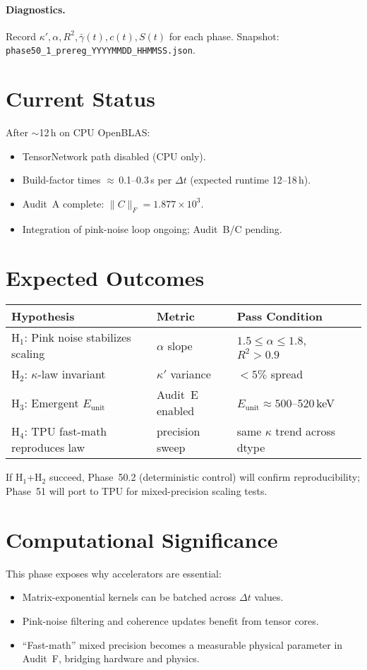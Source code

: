\documentclass[11pt]{article}
\begin{document}
\paragraph{Diagnostics.}  
Record \(\kappa', \alpha, R^2, \bar{\gamma}(t), c(t), S(t)\) for each phase.  
Snapshot: \texttt{phase50\_1\_prereg\_YYYYMMDD\_HHMMSS.json}.

\section{Current Status}
After $\sim$12\,h on CPU OpenBLAS:
\begin{itemize}
\item TensorNetwork path disabled (CPU only).
\item Build-factor times $\approx$\,0.1–0.3\,s per $\Delta t$ (expected runtime 12–18\,h).
\item Audit~A complete: $\|C\|_F = 1.877\times10^3$.
\item Integration of pink-noise loop ongoing; Audit~B/C pending.
\end{itemize}

\section{Expected Outcomes}
\begin{center}
\begin{tabular}{@{}llll@{}}
\toprule
Hypothesis & Metric & Pass Condition \\ \midrule
H$_1$: Pink noise stabilizes scaling & $\alpha$ slope & $1.5\le\alpha\le1.8$, $R^2>0.9$ \\
H$_2$: \(\kappa\)-law invariant & $\kappa'$ variance & $<5\%$ spread \\
H$_3$: Emergent \(E_{\text{unit}}\) & Audit~E enabled & $E_{\text{unit}}\!\approx\!500$–520\,keV \\
H$_4$: TPU fast-math reproduces law & precision sweep & same $\kappa$ trend across dtype \\ \bottomrule
\end{tabular}
\end{center}

If H$_1$+H$_2$ succeed, Phase~50.2 (deterministic control) will confirm reproducibility; Phase~51 will port to TPU for mixed-precision scaling tests.

\section{Computational Significance}
This phase exposes why accelerators are essential:
\begin{itemize}
\item Matrix-exponential kernels can be batched across $\Delta t$ values.
\item Pink-noise filtering and coherence updates benefit from tensor cores.
\item ``Fast-math'' mixed precision becomes a measurable physical parameter in Audit~F, bridging hardware and physics.
\end{itemize}
\end{document}
